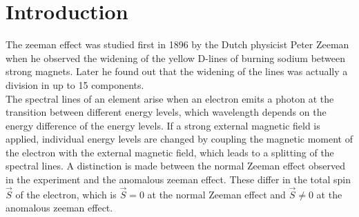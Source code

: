 \section{Introduction}
The zeeman effect was studied first in 1896 by the Dutch physicist Peter Zeeman when he observed the widening of the yellow D-lines of burning sodium between strong magnets.
Later he found out that the widening of the lines was actually a division in up to 15 components.\\
The spectral lines of an element arise when an electron emits a photon at the transition between different energy levels, which wavelength depends on the energy difference of the energy levels.
If a strong external magnetic field is applied, individual energy levels are changed by coupling the magnetic moment of the electron with the external magnetic field, which leads to a splitting of the spectral lines.
A distinction is made between the normal Zeeman effect observed in the experiment and the anomalous zeeman effect.
These differ in the total spin $\vec{S}$ of the electron, which is $\vec{S} = 0$ at the normal Zeeman effect and $\vec{S}\neq 0$ at the anomalous zeeman effect.